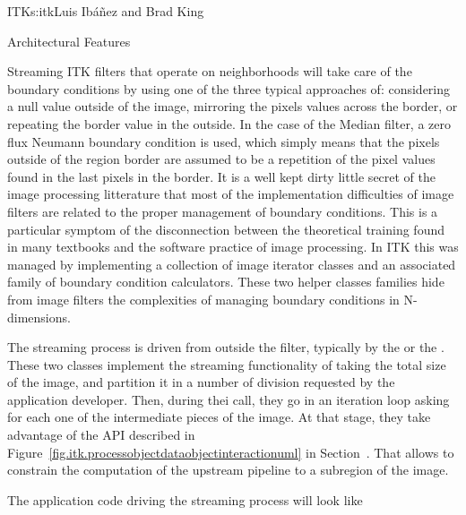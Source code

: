 \begin{aosachapter}{ITK}{s:itk}{Luis Ib\'{a}\~{n}ez and Brad King}
\begin{aosasect1}{Architectural Features}
\begin{aosasect2}{Streaming}
ITK filters that operate on neighborhoods will take care of the boundary
conditions by using one of the three typical approaches of: considering a null
value outside of the image, mirroring the pixels values across the border, or
repeating the border value in the outside. In the case of the Median filter, a
zero flux Neumann boundary condition is used, which simply means that the
pixels outside of the region border are assumed to be a repetition of the pixel
values found in the last pixels in the border. It is a well kept dirty little
secret of the image processing litterature that most of the implementation
difficulties of image filters are related to the proper management of boundary
conditions. This is a particular symptom of the disconnection between the
theoretical training found in many textbooks and the software practice of image
processing.  In ITK this was managed by implementing a collection of image
iterator classes and an associated family of boundary condition calculators.
These two helper classes families hide from image filters the
complexities of managing boundary conditions in N-dimensions.

The streaming process is driven from outside the filter, typically by the
 or the . These two classes
implement the streaming functionality of taking the total size of the image,
and partition it in a number of division requested by the application
developer.  Then, during thei  call, they go in an iteration
loop asking for each one of the intermediate pieces of the image. At that
stage, they take advantage of the  API described in
Figure~\ref{fig.itk.processobjectdataobjectinteractionuml} in
Section~. That allows to constrain the
computation of the upstream pipeline to a subregion of the image.

The application code driving the streaming process will look like

\begin{aosaitemize}
\item {}
\item {}
\item {}
\item {}
\item {}
\item {}
\end{aosaitemize}


\end{aosasect2}
\end{aosasect1}
\end{aosachapter}
